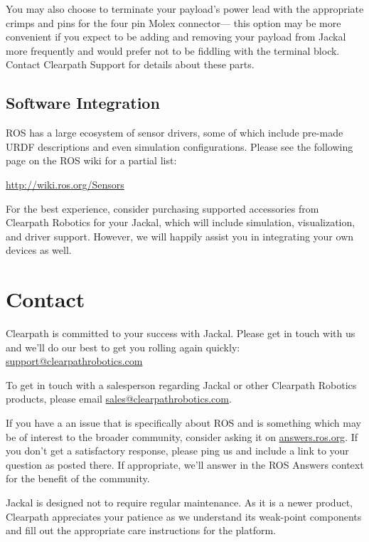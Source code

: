 \documentclass[]{clearpath-manual}
\begin{document}
You may also choose to terminate your payload's power lead with the appropriate crimps and pins
for the four pin Molex connector--- this option may be more convenient if you expect to be adding
and removing your payload from Jackal more frequently and would prefer not to be fiddling with the
terminal block. Contact Clearpath Support for details about these parts.


\subsection{Software Integration}

ROS has a large ecosystem of sensor drivers, some of which include pre-made URDF descriptions and
even simulation configurations. Please see the following page on the ROS wiki for a partial list:

\url{http://wiki.ros.org/Sensors}

For the best experience, consider purchasing supported accessories from Clearpath Robotics for your
Jackal, which will include simulation, visualization, and driver support. However, we will happily
assist you in integrating your own devices as well.


\section{Contact}\label{trouble}\label{contact}

Clearpath is committed to your success with Jackal. Please get in touch with us and we'll
do our best to get you rolling again quickly: \href{mailto:support@clearpathrobotics.com}{support@clearpathrobotics.com}

To get in touch with a salesperson regarding Jackal or other Clearpath Robotics products, please
email \href{mailto:sales@clearpathrobotics.com}{sales@clearpathrobotics.com}.

If you have a an issue that is specifically about ROS and is something which may be of interest
to the broader community, consider asking it on \href{http://answers.ros.org}{answers.ros.org}.
If you don't get a satisfactory response, please ping us and include a link to your question
as posted there. If appropriate, we'll answer in the ROS Answers context for the benefit of the
community.

Jackal is designed not to require regular maintenance. As it is a newer product, Clearpath
appreciates your patience as we understand its weak-point components and fill out the appropriate
care instructions for the platform.
\end{document}
